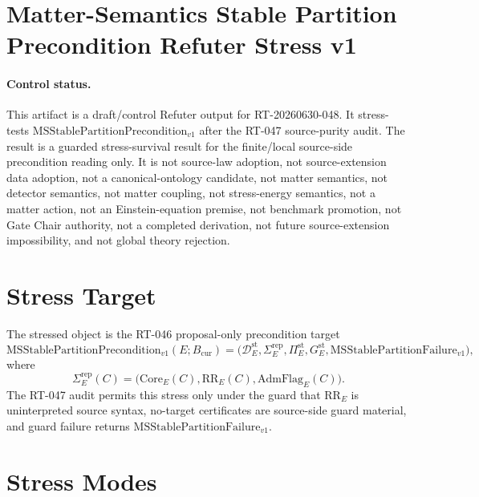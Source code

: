 \section*{Matter-Semantics Stable Partition Precondition Refuter Stress v1}

\paragraph{Control status.}
This artifact is a draft/control Refuter output for RT-20260630-048. It
stress-tests \(\mathrm{MSStablePartitionPrecondition}_{v1}\) after the
RT-047 source-purity audit. The result is a guarded stress-survival result for
the finite/local source-side precondition reading only. It is not source-law
adoption, not source-extension data adoption, not a canonical-ontology
candidate, not matter semantics, not detector semantics, not matter coupling,
not stress-energy semantics, not a matter action, not an Einstein-equation
premise, not benchmark promotion, not Gate Chair authority, not a completed
derivation, not future source-extension impossibility, and not global theory
rejection.

\newcommand{\Bcur}{B_{\mathrm{cur}}}
\newcommand{\MSStablePre}{\mathrm{MSStablePartitionPrecondition}_{v1}}
\newcommand{\MSSig}{\Sigma^{\mathrm{rep}}_E}
\newcommand{\MSPart}{\Pi^{\mathrm{st}}_E}
\newcommand{\MSGuard}{G^{\mathrm{st}}_E}
\newcommand{\MSFail}{\mathrm{MSStablePartitionFailure}_{v1}}

\newtheorem{proposition}{Proposition}

\section{Stress Target}

The stressed object is the RT-046 proposal-only precondition target
\[
  \MSStablePre(E;\Bcur)=
  \bigl(\mathcal D^{\mathrm{st}}_E,\MSSig,\MSPart,\MSGuard,\MSFail\bigr),
\]
where
\[
  \MSSig(C)=
  \bigl(\mathrm{Core}_E(C),\mathrm{RR}_E(C),
  \mathrm{AdmFlag}_E(C)\bigr).
\]
The RT-047 audit permits this stress only under the guard that
\(\mathrm{RR}_E\) is uninterpreted source syntax, no-target certificates are
source-side guard material, and guard failure returns \(\MSFail\).

\section{Stress Modes}

